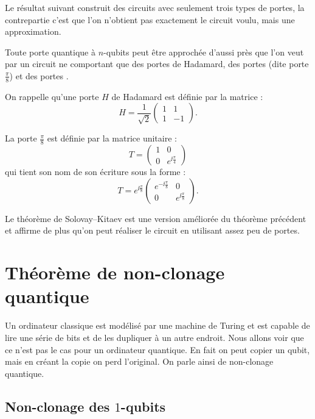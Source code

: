\documentclass[11pt,class=report,crop=false]{standalone}
\begin{document}
\medskip

Le résultat suivant construit des circuits avec seulement trois types de portes, la contrepartie c'est que l'on n'obtient pas exactement le circuit voulu, mais une approximation.

\begin{theoreme}
Toute porte quantique à $n$-qubits peut être approchée d'aussi près que l'on veut par un circuit ne comportant que des portes  de Hadamard, des portes  (dite \og{}porte $\frac\pi8$\fg{}) et des portes .
\end{theoreme}



On rappelle qu'une porte $H$ de Hadamard est définie par la matrice :
$$H = \frac1{\sqrt2}\begin{pmatrix}1&1\\1&-1\end{pmatrix}.$$

La porte $\frac\pi8$ est définie par la matrice unitaire :
$$T = \begin{pmatrix}1&0\\0&e^{\ii\frac\pi4}\end{pmatrix}$$
qui tient son nom de son écriture sous la forme :
$$T = e^{\ii\frac\pi8}\begin{pmatrix}e^{-\ii\frac\pi8}&0\\0&e^{\ii\frac\pi8}\end{pmatrix}.$$

Le théorème de Solovay--Kitaev est une version améliorée du théorème précédent et affirme de plus qu'on peut réaliser le circuit en utilisant assez peu de portes.




\section{Théorème de non-clonage quantique}

Un ordinateur classique est modélisé par une machine de Turing et est capable de lire une série de bits et de les dupliquer à un autre endroit. Nous allons voir que ce n'est pas le cas pour un ordinateur quantique. En fait on peut copier un qubit, mais en créant la copie on perd l'original. On parle ainsi de \og{}non-clonage quantique\fg{}.

\subsection{Non-clonage des $1$-qubits}
\end{document}
